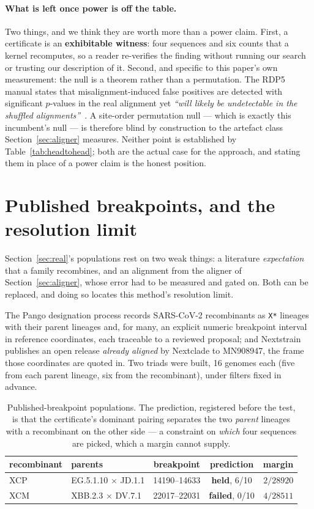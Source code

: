 \documentclass[11pt,a4paper]{article}
\theoremstyle{definition}
\theoremstyle{remark}
\begin{document}
\paragraph{What is left once power is off the table.} Two things, and we think
they are worth more than a power claim. First, a certificate is an
\textbf{exhibitable witness}: four sequences and six counts that a kernel
recomputes, so a reader re-verifies the finding without running our search or
trusting our description of it. Second, and specific to this paper's own
measurement: the null is a theorem rather than a permutation. The RDP5 manual
states that misalignment-induced false positives are detected with significant
$p$-values in the real alignment yet \emph{``will likely be undetectable in the
shuffled alignments''}~\cite{rdp5}. A site-order permutation null --- which is
exactly this incumbent's null --- is therefore blind by construction to the
artefact class Section~\ref{sec:aligner} measures. Neither point is established
by Table~\ref{tab:headtohead}; both are the actual case for the approach, and
stating them in place of a power claim is the honest position.

\section{Published breakpoints, and the resolution limit}\label{sec:breakpoint}

Section~\ref{sec:real}'s populations rest on two weak things: a literature
\emph{expectation} that a family recombines, and an alignment from the aligner of
Section~\ref{sec:aligner}, whose error had to be measured and gated on. Both can
be replaced, and doing so locates this method's resolution limit.

The Pango designation process records SARS-CoV-2 recombinants as \texttt{X*}
lineages with their parent lineages and, for many, an explicit numeric breakpoint
interval in reference coordinates, each traceable to a reviewed proposal; and
Nextstrain publishes an open release \emph{already aligned} by Nextclade to
MN908947, the frame those coordinates are quoted in. Two triads were built, 16
genomes each (five from each parent lineage, six from the recombinant), under
filters fixed in advance.

\begin{table}[h]
\centering\small
\caption{Published-breakpoint populations. The prediction, registered before the
test, is that the certificate's dominant pairing separates the two \emph{parent}
lineages with a recombinant on the other side --- a constraint on \emph{which}
four sequences are picked, which a margin cannot supply.}
\label{tab:breakpoint}
\begin{tabular}{@{}llccr@{}}
\toprule
recombinant & parents & breakpoint & prediction & margin \\
\midrule
XCP & EG.5.1.10 $\times$ JD.1.1 & 14190--14633 & \textbf{held}, 6/10 & $2/28920$ \\
XCM & XBB.2.3 $\times$ DV.7.1 & 22017--22031 & \textbf{failed}, 0/10 & $4/28511$ \\
\bottomrule
\end{tabular}
\end{table}
\end{document}
